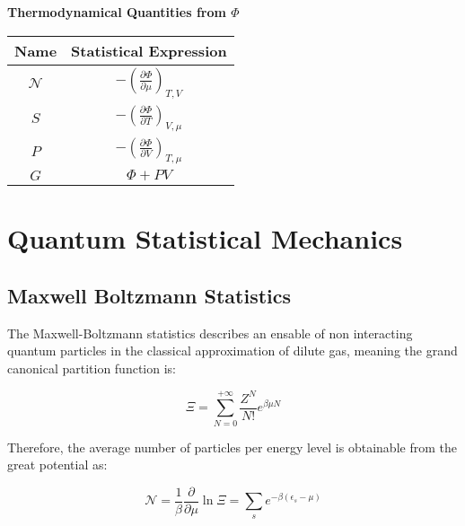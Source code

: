 \documentclass{article}
\begin{document}
\begin{tcolorbox}[colframe=gray!90, colback=gray!5, coltitle=white, sharp corners, title=\textbf{Grand Canonical Ensamble, Summary}, fonttitle=\large\bfseries]
    \vspace{0.3cm}
    \textbf{Thermodynamical Quantities from \(\Phi \)}

    \begin{center}
        \begin{tabular}{|c|c|}
            \hline
            \textbf{Name}     & \textbf{Statistical Expression}                                \\ \hline
            \( \mathcal{N} \) & \( -\left( \frac{\partial \Phi}{\partial \mu} \right)_{T,V} \) \\ \hline
            \( S \)           & \( -\left( \frac{\partial \Phi}{\partial T} \right)_{V,\mu} \) \\ \hline
            \( P \)           & \( -\left( \frac{\partial \Phi}{\partial V} \right)_{T,\mu} \) \\ \hline
            \( G \)           & \( \Phi + PV \)                                                \\ \hline
        \end{tabular}
    \end{center}

\end{tcolorbox}
\newpage

\section{Quantum Statistical Mechanics}

\subsection{Maxwell Boltzmann Statistics}

The Maxwell-Boltzmann statistics describes an ensable of non interacting quantum particles in the classical
approximation of dilute gas, meaning the grand canonical partition function is:

\begin{equation}
    \Xi=\sum_{N=0}^{+\infty}\frac{Z^N}{N!}e^{\beta\mu N}
\end{equation}

Therefore, the average number of particles per energy level is obtainable from the great potential as:

\begin{equation}
    \mathcal{N}=\frac{1}{\beta}\frac{\partial}{\partial \mu}\ln{\Xi}=\sum_{s} e^{-\beta(\epsilon_s-\mu)}
\end{equation}
\end{document}
